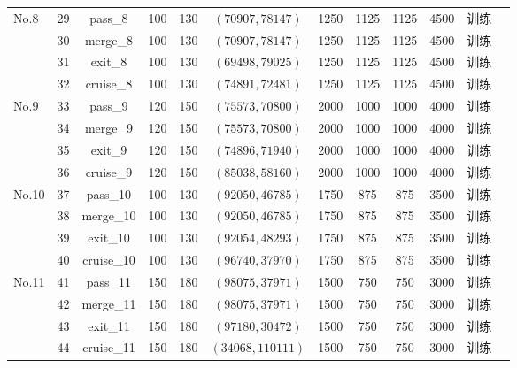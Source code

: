{\begin{longtable}{X c c c c c c c c c c l}
  \multirow{4}{*}{No.8} 
  & 29 & pass\_8 & 100 & 130 & $(70907,78147)$ & 1250 & 1125 & 1125 & 4500 & 训练 \\
  & 30 & merge\_8 & 100 & 130 & $(70907,78147)$ & 1250 & 1125 & 1125 & 4500 & 训练 \\
  & 31 & exit\_8 & 100 & 130 & $(69498,79025)$ & 1250 & 1125 & 1125 & 4500 & 训练 \\
  & 32 & cruise\_8 & 100 & 130 & $(74891,72481)$ & 1250 & 1125 & 1125 & 4500 & 训练 \\
  \midrule

  \multirow{4}{*}{No.9} 
  & 33 & pass\_9 & 120 & 150 & $(75573,70800)$ & 2000 & 1000 & 1000 & 4000 & 训练 \\
  & 34 & merge\_9 & 120 & 150 & $(75573,70800)$ & 2000 & 1000 & 1000 & 4000 & 训练 \\
  & 35 & exit\_9 & 120 & 150 & $(74896,71940)$ & 2000 & 1000 & 1000 & 4000 & 训练 \\
  & 36 & cruise\_9 & 120 & 150 & $(85038,58160)$ & 2000 & 1000 & 1000 & 4000 & 训练 \\
  \midrule

  \multirow{4}{*}{No.10} 
  & 37 & pass\_10 & 100 & 130 & $(92050,46785)$ & 1750 & 875 & 875 & 3500 & 训练 \\
  & 38 & merge\_10 & 100 & 130 & $(92050,46785)$ & 1750 & 875 & 875 & 3500 & 训练 \\
  & 39 & exit\_10 & 100 & 130 & $(92054,48293)$ & 1750 & 875 & 875 & 3500 & 训练 \\
  & 40 & cruise\_10 & 100 & 130 & $(96740,37970)$ & 1750 & 875 & 875 & 3500 & 训练 \\
  \midrule

  \multirow{4}{*}{No.11} 
  & 41 & pass\_11 & 150 & 180 & $(98075,37971)$ & 1500 & 750 & 750 & 3000 & 训练 \\
  & 42 & merge\_11 & 150 & 180 & $(98075,37971)$ & 1500 & 750 & 750 & 3000 & 训练 \\
  & 43 & exit\_11 & 150 & 180 & $(97180,30472)$ & 1500 & 750 & 750 & 3000 & 训练 \\
  & 44 & cruise\_11 & 150 & 180 & $(34068,110111)$ & 1500 & 750 & 750 & 3000 & 训练 \\
  \midrule


\end{longtable}}
